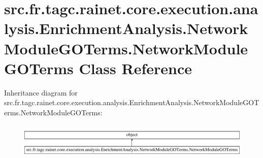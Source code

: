 \hypertarget{classsrc_1_1fr_1_1tagc_1_1rainet_1_1core_1_1execution_1_1analysis_1_1EnrichmentAnalysis_1_1Netwocd24f37753b2377449d55719611022ad}{\section{src.\-fr.\-tagc.\-rainet.\-core.\-execution.\-analysis.\-Enrichment\-Analysis.\-Network\-Module\-G\-O\-Terms.\-Network\-Module\-G\-O\-Terms Class Reference}
\label{classsrc_1_1fr_1_1tagc_1_1rainet_1_1core_1_1execution_1_1analysis_1_1EnrichmentAnalysis_1_1Netwocd24f37753b2377449d55719611022ad}
}
Inheritance diagram for src.\-fr.\-tagc.\-rainet.\-core.\-execution.\-analysis.\-Enrichment\-Analysis.\-Network\-Module\-G\-O\-Terms.\-Network\-Module\-G\-O\-Terms\-:\begin{figure}[H]
\begin{center}
\leavevmode
\includegraphics[height=1.702128cm]{classsrc_1_1fr_1_1tagc_1_1rainet_1_1core_1_1execution_1_1analysis_1_1EnrichmentAnalysis_1_1Netwocd24f37753b2377449d55719611022ad}
\end{center}
\end{figure}
